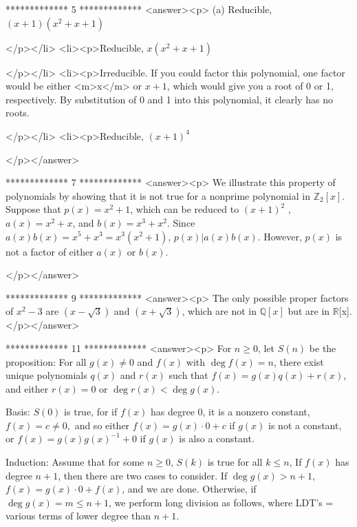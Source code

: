 *************
5
*************
<answer><p> (a) Reducible, \((x+1)\left(x^2+ x+1\right)\)

</p></li>
<li><p>Reducible,  \(x\left(x^2+x+1\right)\)

</p></li>
<li><p>Irreducible. If you could factor this polynomial, one factor would be either <m>x</m> or \(x + 1\), which would give you a root of 0 or 1,
respectively. By substitution of 0 and 1 into this polynomial, it clearly has no roots.

</p></li>
<li><p>Reducible, \((x+1)^{4\text{  }}\)

</p></answer>


*************
7
*************
<answer><p> We illustrate this property of polynomials by showing that it is not true for a nonprime polynomial in \(\mathbb{Z}_2[x]\). Suppose that \(p(x)
= x^2+ 1\), which can be reduced to \((x+1)^2\) , \(a(x) = x^2 + x\), and \(b(x) = x^3 + x^2\). Since \(a(x)b(x) =x^5+x^3= x^3\left(x^2+1\right)\),
\(p(x)|a(x)b(x)\). However, \(p(x)\) is not a factor of either \(a(x)\) or \(b(x)\).

</p></answer>


*************
9
*************
<answer><p> The only possible proper factors of \(x^2- 3\) are \(\left(x - \sqrt{3}\right)\) and \(\left(x+\sqrt{3}\right)\), which are not in \(\mathbb{Q}[x]\)
but are in $\mathbb{R}$[x].</p></answer>


*************
11
*************
<answer><p> For \(n \geq  0\), let \(S(n)\) be the proposition: For all \(g(x)\neq 0\) and \(f(x)\) with \(\deg  f(x) = n\), there exist unique polynomials
\(q(x)\) and \(r(x)\) such that \(f(x)=g(x)q(x)+r(x)\), and either \(r(x)=0\) or  \(\deg  r(x) < \deg  g(x)\).



Basis: \(S(0)\) is true, for if \(f(x)\)  has degree 0, it is a nonzero constant, \(f(x)=c\neq 0,\) and so either \(f(x) =g(x)\cdot 0 + c\)  if
\(g(x)\) is not a constant, or \(f(x) = g(x)g(x)^{-1}+0\) if \(g(x)\) is also a constant.



Induction: Assume that for some \(n\geq 0\), \(S(k)\) is true for all \(k \leq  n\), If \(f(x)\) has degree \(n+1\), then there are two cases to
consider. If \(\deg  g(x) > n + 1\), \(f(x) = g(x)\cdot 0 + f(x)\), and we are done. Otherwise, if \(\deg  g(x) =m \leq  n + 1\), we perform long
division as follows, where LDT{'}s = various terms of lower degree than \(n+1\).



